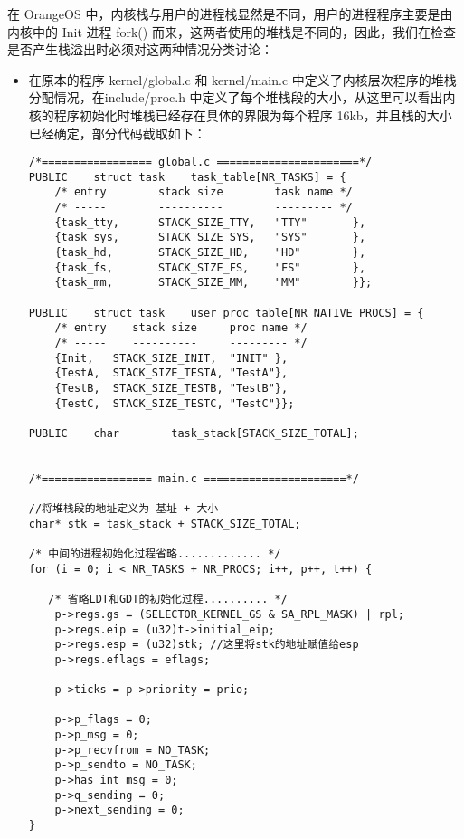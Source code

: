 \documentclass{whureport}
\begin{document}
在 OrangeOS 中，内核栈与用户的进程栈显然是不同，用户的进程程序主要是由内核中的 Init 进程 fork() 而来，这两者使用的堆栈是不同的，因此，我们在检查是否产生栈溢出时必须对这两种情况分类讨论：
\begin{itemize}
	\item 在原本的程序 kernel/global.c 和 kernel/main.c 中定义了内核层次程序的堆栈分配情况，在include/proc.h 中定义了每个堆栈段的大小，从这里可以看出内核的程序初始化时堆栈已经存在具体的界限为每个程序 16kb，并且栈的大小已经确定，部分代码截取如下：
	\begin{lstlisting}
/*================= global.c ======================*/
PUBLIC    struct task    task_table[NR_TASKS] = {
    /* entry        stack size        task name */
    /* -----        ----------        --------- */
    {task_tty,      STACK_SIZE_TTY,   "TTY"       },
    {task_sys,      STACK_SIZE_SYS,   "SYS"       },
    {task_hd,       STACK_SIZE_HD,    "HD"        },
    {task_fs,       STACK_SIZE_FS,    "FS"        },
    {task_mm,       STACK_SIZE_MM,    "MM"        }};

PUBLIC    struct task    user_proc_table[NR_NATIVE_PROCS] = {
    /* entry    stack size     proc name */
    /* -----    ----------     --------- */
    {Init,   STACK_SIZE_INIT,  "INIT" },
    {TestA,  STACK_SIZE_TESTA, "TestA"},
    {TestB,  STACK_SIZE_TESTB, "TestB"},
    {TestC,  STACK_SIZE_TESTC, "TestC"}};

PUBLIC    char        task_stack[STACK_SIZE_TOTAL];


/*================= main.c ======================*/

//将堆栈段的地址定义为 基址 + 大小
char* stk = task_stack + STACK_SIZE_TOTAL;

/* 中间的进程初始化过程省略............. */
for (i = 0; i < NR_TASKS + NR_PROCS; i++, p++, t++) {
    
   /* 省略LDT和GDT的初始化过程.......... */
    p->regs.gs = (SELECTOR_KERNEL_GS & SA_RPL_MASK) | rpl;
    p->regs.eip = (u32)t->initial_eip;
    p->regs.esp = (u32)stk; //这里将stk的地址赋值给esp
    p->regs.eflags = eflags;

    p->ticks = p->priority = prio;

    p->p_flags = 0;
    p->p_msg = 0;
    p->p_recvfrom = NO_TASK;
    p->p_sendto = NO_TASK;
    p->has_int_msg = 0;
    p->q_sending = 0;
    p->next_sending = 0;
}


\end{lstlisting}
\end{itemize}
\end{document}
